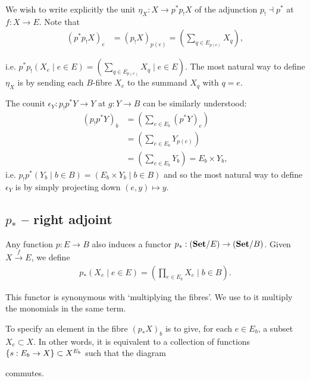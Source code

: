 We wish to write explicitly the unit $\eta_X : X \to p^*p_!X$ of the adjunction $p_! \dashv p^*$ at $f:X\to E$. Note that
\begin{align*}
	(p^*p_!X)_e &= (p_!X)_{p(e)} = \left( \sum_{q\in E_{p(e)}} X_q \right),
\end{align*}

i.e. $p^*p_!\left( X_e \mid e\in E \right)= \left( \sum_{q\in E_{p(e)}} X_q \mid e\in E \right)$. The most natural way to define $\eta_X$ is by sending each $B$-fibre $X_e$ to the summand $X_q$ with $q=e$.

The counit $\epsilon_Y : p_!p^*Y \to Y$ at $g:Y\to B$ can be similarly understood:
\begin{align*}
	(p_!p^*Y)_b &= \left( \sum_{e\in E_b} (p^*Y)_e \right)\\
		&= \left( \sum_{e\in E_b} Y_{p(e)} \right)\\
		&= \left( \sum_{e\in E_b} Y_b \right) = E_b \times Y_b,
\end{align*}
i.e. $p_!p^*\left(Y_b \mid b\in B \right) = \left( E_b\times Y_b \mid b\in B \right)$ and so the most natural way to define $\epsilon_Y$ is by simply projecting down $(e,y) \mapsto y$.


\subsection{$p_*$ -- right adjoint}

Any function $p:E\to B$ also induces a functor $p_*: (\mathbf{Set}/E)\to(\mathbf{Set}/B)$. Given $X\overset{f}{\to} E$, we define
\begin{align*}
	p_*\left( X_e \mid e\in E \right) = \left( \prod_{e\in E_b} X_{e} \mid b\in B \right).
\end{align*}

This functor is synonymous with `multiplying the fibres'. We use to it multiply the monomials in the same term.

To specify an element in the fibre $(p_*X)_b$ is to give, for each $e\in E_b$, a subset $X_e\subset X$. In other words, it is equivalent to a collection of functions $\{s:E_b\to X\}\subset X^{E_b}$ such that the diagram
\begin{center}
\end{center}
commutes.


